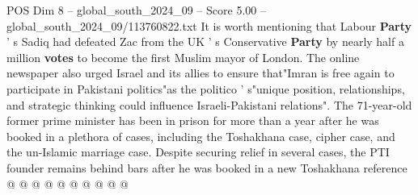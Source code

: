 \begin{textsample}{POS Dim 8 – global\_south\_2024\_09 – Score 5.00 – global\_south\_2024\_09/113760822.txt}
It is worth mentioning that Labour \textbf{Party} ' s Sadiq had defeated Zac from the UK ' s Conservative \textbf{Party} by nearly half a million \textbf{votes} to become the first Muslim mayor of London.
The online newspaper also urged Israel and its allies to ensure that"Imran is free again to participate in Pakistani politics"as the politico ' s"unique position, relationships, and strategic thinking could influence Israeli-Pakistani relations".
The 71-year-old former prime minister has been in prison for more than a year after he was booked in a plethora of cases, including the Toshakhana case, cipher case, and the un-Islamic marriage case.
Despite securing relief in several cases, the PTI founder remains behind bars after he was booked in a new Toshakhana reference @ @ @ @ @ @ @ @ @ @

\end{textsample}
